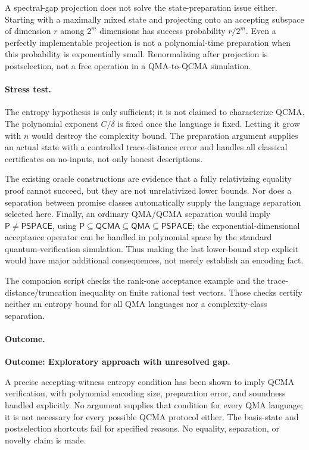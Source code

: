 \documentclass[11pt,a4paper]{article}
\numberwithin{equation}{section}
\begin{document}
A spectral-gap projection does not solve the state-preparation issue
either.  Starting with a maximally mixed state and projecting onto an
accepting subspace of dimension $r$ among $2^m$ dimensions has success
probability $r/2^m$.  Even a perfectly implementable projection is not a
polynomial-time preparation when this probability is exponentially small.
Renormalizing after projection is postselection, not a free operation
in a QMA-to-QCMA simulation.

\paragraph{Stress test.}
The entropy hypothesis is only sufficient; it is not claimed to
characterize QCMA.  The polynomial exponent $C/\delta$ is fixed once
the language is fixed.  Letting it grow with $n$ would destroy the
complexity bound.  The preparation argument supplies an actual state
with a controlled trace-distance error and handles all classical
certificates on no-inputs, not only honest descriptions.

The existing oracle constructions are evidence that a fully relativizing
equality proof cannot succeed, but they are not unrelativized lower
bounds.  Nor does a separation between promise classes automatically
supply the language separation selected here.  Finally, an ordinary
QMA/QCMA separation would imply $\mathsf P\ne\mathsf{PSPACE}$, using
$\mathsf P\subseteq\mathsf{QCMA}\subseteq\mathsf{QMA}\subseteq
\mathsf{PSPACE}$; the exponential-dimensional acceptance operator can be
handled in polynomial space by the standard quantum-verification
simulation.  Thus making the last lower-bound step explicit would have
major additional consequences, not merely establish an encoding fact.

The companion script checks the rank-one acceptance example and the
trace-distance/truncation inequality on finite rational test vectors.
Those checks certify neither an entropy bound for all QMA languages
nor a complexity-class separation.

\paragraph{Outcome.}
\textbf{Outcome: Exploratory approach with unresolved gap.}

A precise accepting-witness entropy condition has been shown to imply
QCMA verification, with polynomial encoding size, preparation error,
and soundness handled explicitly.  No argument supplies that condition
for every QMA language; it is not necessary for every possible QCMA
protocol either.  The basis-state and postselection shortcuts fail for
specified reasons.  No equality, separation, or novelty claim is made.
\end{document}

